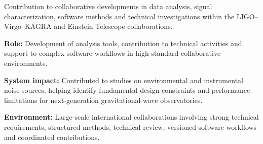 \documentclass[8pt,a4paper,ragged2e,withhyper]{altacv}
\begin{document}
Contribution to collaborative developments in data analysis, signal characterization, software methods and technical investigations within the LIGO--Virgo--KAGRA and Einstein Telescope collaborations.

\textbf{Role:} Development of analysis tools, contribution to technical activities and support to complex software workflows in high-standard collaborative environments.

\textbf{System impact:} Contributed to studies on environmental and instrumental noise sources, helping identify fundamental design constraints and performance limitations for next-generation gravitational-wave observatories.

\textbf{Environment:} Large-scale international collaborations involving strong technical requirements, structured methods, technical review, versioned software workflows and coordinated contributions.


\vspace{-.3cm}


{\small
{}
\newline
{}
\newline
{}
}

\divider\smallskip
\vspace{-.3cm}


{\small
{}
}
\end{document}
